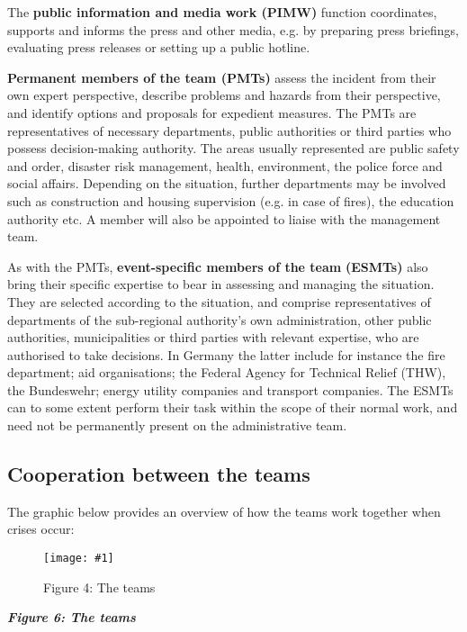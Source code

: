 \documentclass{article}
\newlength{\imgwidth}
\newcommand\scaledgraphics[2]{%
                
\settowidth{\imgwidth}{\texttt{[image: \#1]}}%
                
\setlength{\imgwidth}{\minof{\imgwidth}{#2\textwidth}}%
                
\texttt{[image: \#1]}%
                
}
\begin{document}
The \textbf{public information and media work (PIMW)} function coordinates, supports and informs the press and other media, e.g. by preparing press briefings, evaluating press releases or setting up a public hotline.


\textbf{Permanent members of the team (PMTs)} assess the incident from their own expert perspective, describe problems and hazards from their perspective, and identify options and proposals for expedient measures. The PMTs are representatives of necessary departments, public authorities or third parties who possess decision-making authority. The areas usually represented are public safety and order, disaster risk management, health, environment, the police force and social affairs. Depending on the situation, further departments may be involved such as construction and housing supervision (e.g. in case of fires), the education authority etc. A member will also be appointed to liaise with the management team.


As with the PMTs, \textbf{event-specific members of the team} \textbf{(ESMTs) }also bring their specific expertise to bear in assessing and\textbf{ }managing the situation. They are selected according to the situation, and comprise representatives of departments of the sub-regional authority's own administration, other public authorities, municipalities or third parties with relevant expertise, who are authorised to take decisions. In Germany the latter include for instance the fire department; aid organisations; the Federal Agency for Technical Relief (THW), the Bundeswehr; energy utility companies and transport companies. The ESMTs can to some extent perform their task within the scope of their normal work, and need not be permanently present on the administrative team.


\subsection{Cooperation between the teams}\label{H9060171}



The graphic below provides an overview of how the teams work together when crises occur:  

\begin{figure}
\scaledgraphics{79e588fd-6cf6-494d-ab3b-92e25bbd1c8b.png}{1}
\caption*{Figure 4: The teams}\label{F84973601}
\end{figure}


\emph{\textbf{Figure 6: The teams}}
\end{document}
